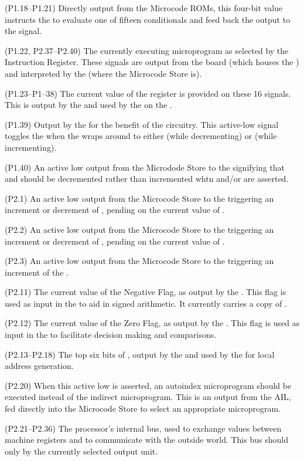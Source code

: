 \begin{description}
 (P1.18–P1.21) Directly output from the
Microcode ROMs, this four-bit value instructs the \SBU{} to evaluate
one of fifteen conditionals and feed back the output to the \SKIP
signal.

 (P1.22, P2.37–P2.40) The currently executing microprogram
  as selected by the Instruction Register. These signals are output from the
   board (which houses the \IR) and interpreted by the 
  (where the Microcode Store is).

 (P1.23–P1–38) The current value of the \AC{}
  register is provided on these 16 signals. This is output by the
   and used by the \ALU on the .

\li{\ACCPL} (P1.39) Output by the  for the benefit of the
\Lreg{} circuitry. This active-low signal toggles the \Lreg{} when the
\AC{} wraps around to either  (while decrementing) or
 (while incrementing).

\li{\DEC} (P1.40) An active low output from the Microdode Store to the
 signifying that \AC{} and \DR{} should be decremented
rather than incremented whtn \STPAC{} and/or \STPDR{} are asserted.


\li{\STPAC} (P2.1) An active low output from the Microcode Store to
the  triggering an increment or decrement of \AC{}, pending
on the current value of \DEC.

\li{\STPDR} (P2.2) An active low output from the Microcode Store to
the  triggering an increment or decrement of \DR{}, pending
on the current value of \DEC.

\li{\INCPC} (P2.3) An active low output from the Microcode Store to
the  triggering an increment of the \PC{}.

\li{\FNEG} (P2.11) The current value of the Negative Flag, as output
by the . This flag is used as input in the \SBU to aid in signed
arithmetic. It currently carries a copy of .

\li{\FZERO} (P2.12) The current value of the Zero Flag, as output by
the . This flag is used as input in the \SBU to facilitate
decision making and comparisons.

 (P2.13–P2.18) The top six bits of \PC{}, output
by the  and used by the \AGL{} for local address
generation.

\li{\AINDEX} (P2.20) When this active low is asserted, an autoindex
microprogram should be executed instead of the indirect
microprogram. This is an output from the \unit{AIL}, fed directly into
the Microcode Store to select an appropriate microprogram.

 (P2.21–P2.36) The processor's internal bus,
  used to exchange values between machine registers and to communicate
  with the outside world. This bus should only by the currently
  selected output unit.

\end{description}


